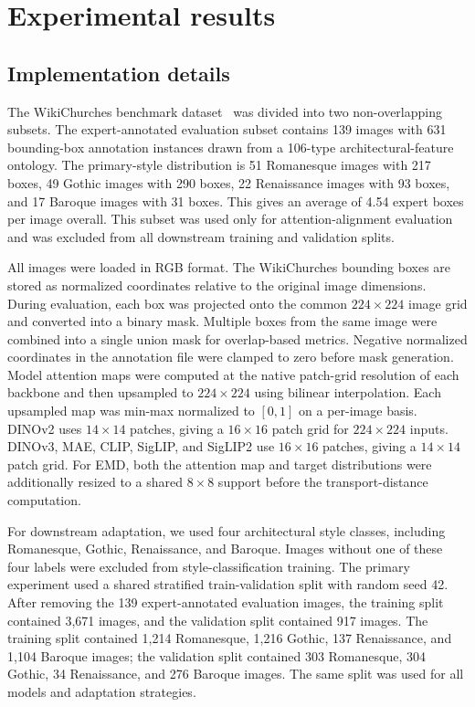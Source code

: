 \documentclass[lineno,pdflatex,sn-mathphys-num]{sn-jnl}%
\theoremstyle{thmstyleone}%
\theoremstyle{thmstyletwo}%
\theoremstyle{thmstylethree}%
\begin{document}
\section{Experimental results} \label{section results}

\subsection{Implementation details}

The WikiChurches benchmark dataset~\cite{Barz21WikiChurches} was divided into two non-overlapping subsets. The expert-annotated evaluation subset contains 139 images with 631 bounding-box annotation instances drawn from a 106-type architectural-feature ontology. The primary-style distribution is 51 Romanesque images with 217 boxes, 49 Gothic images with 290 boxes, 22 Renaissance images with 93 boxes, and 17 Baroque images with 31 boxes. This gives an average of 4.54 expert boxes per image overall. This subset was used only for attention-alignment evaluation and was excluded from all downstream training and validation splits.

All images were loaded in RGB format. The WikiChurches bounding boxes are stored as normalized coordinates relative to the original image dimensions. During evaluation, each box was projected onto the common $224 \times 224$ image grid and converted into a binary mask. Multiple boxes from the same image were combined into a single union mask for overlap-based metrics. Negative normalized coordinates in the annotation file were clamped to zero before mask generation. Model attention maps were computed at the native patch-grid resolution of each backbone and then upsampled to $224 \times 224$ using bilinear interpolation. Each upsampled map was min-max normalized to $[0,1]$ on a per-image basis. DINOv2 uses $14 \times 14$ patches, giving a $16 \times 16$ patch grid for $224 \times 224$ inputs. DINOv3, MAE, CLIP, SigLIP, and SigLIP2 use $16 \times 16$ patches, giving a $14 \times 14$ patch grid. For EMD, both the attention map and target distributions were additionally resized to a shared $8 \times 8$ support before the transport-distance computation.

For downstream adaptation, we used four architectural style classes, including Romanesque, Gothic, Renaissance, and Baroque. Images without one of these four labels were excluded from style-classification training. The primary experiment used a shared stratified train-validation split with random seed 42. After removing the 139 expert-annotated evaluation images, the training split contained 3,671 images, and the validation split contained 917 images. The training split contained 1,214 Romanesque, 1,216 Gothic, 137 Renaissance, and 1,104 Baroque images; the validation split contained 303 Romanesque, 304 Gothic, 34 Renaissance, and 276 Baroque images. The same split was used for all models and adaptation strategies.
\end{document}
